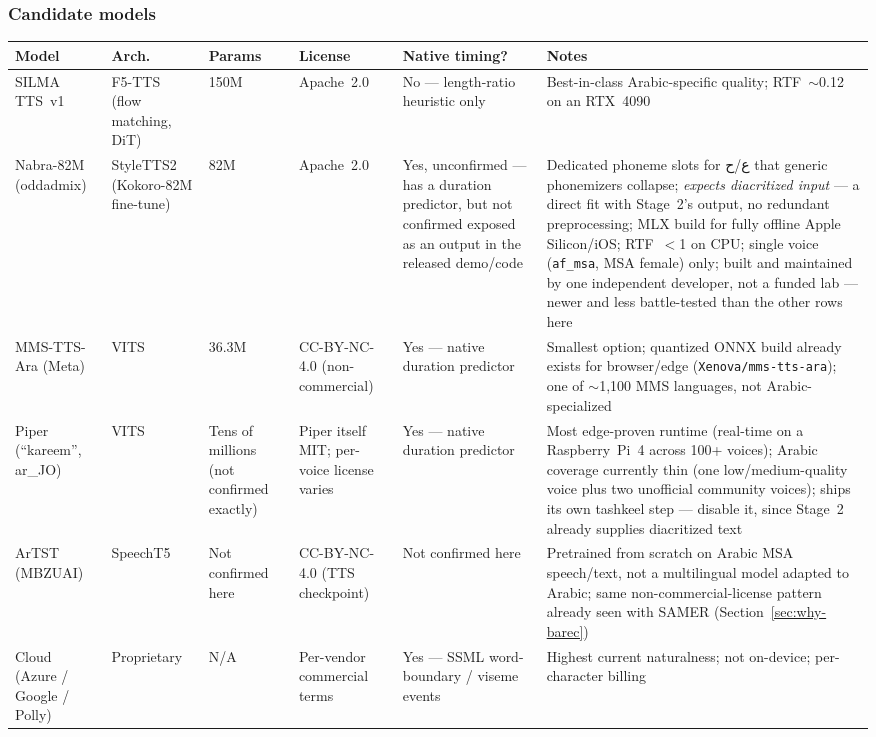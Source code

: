 \documentclass[11pt,a4paper]{article}
\begin{document}
\subsubsection{Candidate models}
\label{sec:tts-models}

\begin{center}
\small
\begin{longtable}{@{}p{2.3cm}p{1.7cm}p{1.5cm}p{2.3cm}p{1.6cm}p{3.7cm}@{}}
\toprule
\textbf{Model} & \textbf{Arch.} & \textbf{Params} & \textbf{License} &
\textbf{Native timing?} & \textbf{Notes} \\
\midrule
\endhead
SILMA TTS~v1 & F5-TTS (flow matching, DiT) & 150M & Apache~2.0 & No ---
length-ratio heuristic only & Best-in-class Arabic-specific quality; RTF~$\sim$0.12
on an RTX~4090 \\
\addlinespace
Nabra-82M (oddadmix) & StyleTTS2 (Kokoro-82M fine-tune) & 82M & Apache~2.0 &
Yes, unconfirmed --- has a duration predictor, but not confirmed exposed as
an output in the released demo/code & Dedicated phoneme slots for
ع/ح that generic phonemizers collapse; \emph{expects diacritized input} ---
a direct fit with Stage~2's output, no redundant preprocessing; MLX build
for fully offline Apple Silicon/iOS; RTF~$<$1 on CPU; single voice
(\texttt{af\_msa}, MSA female) only; built and maintained by one independent
developer, not a funded lab --- newer and less battle-tested than the other
rows here \\
\addlinespace
MMS-TTS-Ara (Meta) & VITS & 36.3M & CC-BY-NC-4.0 (non-commercial) & Yes ---
native duration predictor & Smallest option; quantized ONNX build already
exists for browser/edge (\texttt{Xenova/mms-tts-ara}); one of $\sim$1{,}100
MMS languages, not Arabic-specialized \\
\addlinespace
Piper (``kareem'', ar\_JO) & VITS & Tens of millions (not confirmed exactly)
& Piper itself MIT; per-voice license varies & Yes --- native duration
predictor & Most edge-proven runtime (real-time on a Raspberry~Pi~4 across
100+ voices); Arabic coverage currently thin (one low/medium-quality voice
plus two unofficial community voices); ships its own tashkeel step ---
disable it, since Stage~2 already supplies diacritized text \\
\addlinespace
ArTST (MBZUAI) & SpeechT5 & Not confirmed here & CC-BY-NC-4.0
(TTS checkpoint) & Not confirmed here & Pretrained from scratch on Arabic
MSA speech/text, not a multilingual model adapted to Arabic; same
non-commercial-license pattern already seen with SAMER (Section~\ref{sec:why-barec}) \\
\addlinespace
Cloud (Azure / Google / Polly) & Proprietary & N/A & Per-vendor commercial
terms & Yes --- SSML word-boundary / viseme events & Highest current
naturalness; not on-device; per-character billing \\
\bottomrule
\end{longtable}
\end{center}
\end{document}
